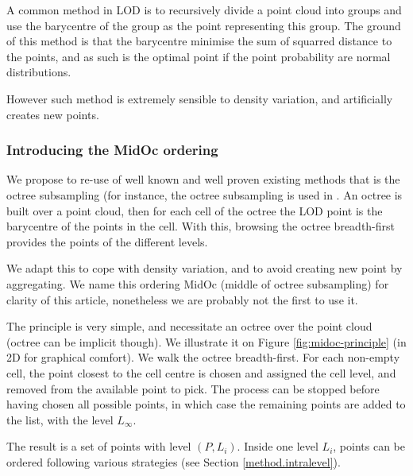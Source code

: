 		A common method in LOD is to recursively divide a point cloud into groups and use the barycentre of the group as the point representing this group. The ground of this method is that the barycentre minimise the sum of squarred distance to the points, and as such is the optimal point if the point probability are normal distributions.
		
		However such method is extremely sensible to density variation, and artificially creates new points. 
		
		\subsubsection{Introducing the MidOc ordering}
		
		
		We propose to re-use of well known and well proven existing methods that is the octree subsampling (for instance, the octree subsampling is used in \cite{Girardeau-Montaut2014}.
		An octree is built over a point cloud, then for each cell of the octree the LOD point is the barycentre of the points in the cell.  With this, browsing the octree breadth-first provides the points of the different levels.
		
		We adapt this to cope with density variation, and to avoid creating new point by aggregating.   
		We name this ordering MidOc (middle of octree subsampling) for clarity of this article, nonetheless we are probably not the first to use it.
		
		The principle is very simple, and necessitate an octree over the point cloud (octree can be implicit though).
		We illustrate it on Figure \ref{fig:midoc-principle} (in 2D for graphical comfort).
		We walk the octree breadth-first.
		For each non-empty cell, the point closest to the cell centre is chosen and assigned the cell level,
		and removed from the available point to pick.
		The process can be stopped before having chosen all possible points,
		in which case the remaining points are added to the list, with the level $L_\infty$.
		
		The result is a set of points with level $(P,L_i)$.
		Inside one level $L_i$, points can be ordered following various strategies (see Section \ref{method.intralevel}).
		
